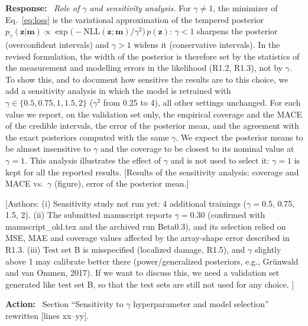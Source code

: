 \documentclass[11pt]{article}
\newenvironment{response}{\par\smallskip\noindent\color{resp}\textbf{Response:}\ }{\par}
\newenvironment{action}{\par\smallskip\noindent\color{resp}\textbf{Action:}\ }{\par}
\newcommand{\authornote}[1]{\textcolor{note}{\textsf{[Authors: #1]}}}
\newcommand{\tbd}[1]{\textcolor{note}{\textsf{[#1]}}}
\newcommand{\lines}[1]{\tbd{lines #1}}
\newcommand{\m}{\mathbf{m}}
\newcommand{\z}{\mathbf{z}}
\begin{document}
\begin{response}
\textit{Role of $\gamma$ and sensitivity analysis.} For $\gamma\neq1$, the minimizer of Eq.~\eqref{eq:loss} is the
variational approximation of the tempered posterior $p_\gamma(\z|\m)\propto\exp\big(-\mathrm{NLL}(\z;\m)/\gamma^2\big)\,
p(\z)$: $\gamma<1$ sharpens the posterior (overconfident intervals) and $\gamma>1$ widens it (conservative intervals).
In the revised formulation, the width of the posterior is therefore set by the statistics of the measurement and
modelling errors in the likelihood (R1.2, R1.3), not by $\gamma$. To show this, and to document how sensitive the
results are to this choice, we add a sensitivity analysis in which the model is retrained with
$\gamma\in\{0.5,0.75,1,1.5,2\}$ ($\gamma^2$ from 0.25 to 4), all other settings unchanged. For each value we report,
on the validation set only, the empirical coverage and the MACE of the credible intervals, the error of the posterior
mean, and the agreement with the exact posteriors computed with the same $\gamma$. We expect the posterior means to be
almost insensitive to $\gamma$ and the coverage to be closest to its nominal value at $\gamma=1$. This analysis
illustrates the effect of $\gamma$ and is not used to select it: $\gamma=1$ is kept for all the reported results.
\tbd{Results of the sensitivity analysis: coverage and MACE vs.\ $\gamma$ (figure), error of the posterior mean.}
\end{response}
\authornote{(i) Sensitivity study not run yet: 4 additional trainings ($\gamma=0.5$, 0.75, 1.5, 2). (ii) The submitted
manuscript reports $\gamma=0.30$ (confirmed with manuscript\_old.tex and the archived run Beta0.3), and its selection
relied on MSE, MAE and coverage values affected by the array-shape error described in R1.3. (iii) Test set B is misspecified (localized damage, R1.5), and $\gamma$ slightly above 1 may calibrate better
there (power/generalized posteriors, e.g., Gr\"unwald and van Ommen, 2017). If we want to discuss this, we need a
validation set generated like test set B, so that the test sets are still not used for any choice. }

\begin{action}
Section ``Sensitivity to $\gamma$ hyperparameter and model selection'' rewritten \lines{xx--yy}.
\end{action}
\end{document}
